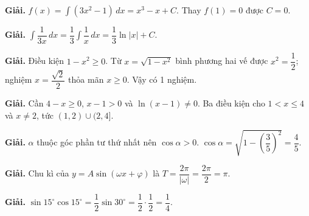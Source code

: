 \documentclass[11pt, a4paper]{article}
\begin{document}
\vspace{0.3cm}
\begin{dapan}[8 — Đáp án C]

\textbf{Giải.} $f(x)=\displaystyle\int(3x^2-1)\,dx=x^3-x+C$. Thay $f(1)=0$ được $C=0$.


\end{dapan}
\vspace{0.3cm}
\begin{dapan}[9 — Đáp án A]

\textbf{Giải.} $\displaystyle\int \dfrac{1}{3x}\,dx=\dfrac{1}{3}\int\dfrac{1}{x}\,dx=\dfrac{1}{3}\ln\lvert x \rvert+C$.


\end{dapan}
\vspace{0.3cm}
\begin{dapan}[10 — Đáp án A]

\textbf{Giải.} Điều kiện $1-x^2 \ge 0$. Từ $x=\sqrt{1-x^2}$ bình phương hai vế được $x^2=\dfrac{1}{2}$; nghiệm $x=\dfrac{\sqrt{2}}{2}$ thỏa mãn $x \ge 0$. Vậy có 1 nghiệm.


\end{dapan}
\vspace{0.3cm}
\begin{dapan}[11 — Đáp án A]

\textbf{Giải.} Cần $4-x \ge 0$, $x-1>0$ và $\ln(x-1) \ne 0$. Ba điều kiện cho $1<x \le 4$ và $x \ne 2$, tức $(1,2) \cup (2,4]$.


\end{dapan}
\vspace{0.3cm}
\begin{dapan}[12 — Đáp án C]

\textbf{Giải.} $\alpha$ thuộc góc phần tư thứ nhất nên $\cos\alpha>0$. $\cos\alpha=\sqrt{1-\left(\dfrac{3}{5}\right)^2}=\dfrac{4}{5}$.


\end{dapan}
\vspace{0.3cm}
\begin{dapan}[13 — Đáp án D]

\textbf{Giải.} Chu kì của $y=A\sin(\omega x+\varphi)$ là $T=\dfrac{2\pi}{\lvert \omega \rvert}=\dfrac{2\pi}{2}=\pi$.


\end{dapan}
\vspace{0.3cm}
\begin{dapan}[14 — Đáp án A]

\textbf{Giải.} $\sin 15^\circ \cos 15^\circ=\dfrac{1}{2}\sin 30^\circ=\dfrac{1}{2} \cdot \dfrac{1}{2}=\dfrac{1}{4}$.


\end{dapan}
\end{document}
